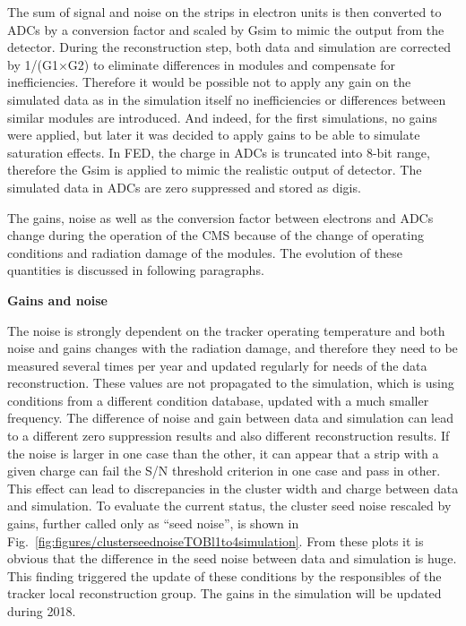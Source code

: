  The sum of signal and noise on the strips in electron units is then converted to ADCs by a conversion factor and scaled by Gsim to mimic the output from the detector. During the reconstruction step, both data and simulation are corrected by 1/(G1$\times$G2) to eliminate differences in modules and compensate for inefficiencies. Therefore it would be possible not to apply any gain on the simulated data as in the simulation itself no inefficiencies or differences between similar modules are introduced. And indeed, for the first simulations, no gains were applied, but later it was decided to apply gains to be able to simulate saturation effects. In FED, the charge in ADCs is truncated into 8-bit range, therefore the Gsim is applied to mimic the realistic output of detector. The simulated data in ADCs are zero suppressed and stored as digis.

The gains, noise as well as the conversion factor between electrons and ADCs change during the operation of the CMS because of the change of operating conditions and radiation damage of the modules. The evolution of these quantities is discussed in following paragraphs.   
 
\textbf{Gains and noise}

The noise is strongly dependent on the tracker operating temperature and both noise and gains changes with the radiation damage, and therefore they need to be measured several times per year and updated regularly for needs of the data reconstruction. These values are not propagated to the simulation, which is using conditions from a different condition database, updated with a much smaller frequency. The difference of noise and gain between data and simulation can lead to a different zero suppression results and also different reconstruction results. If the noise is larger in one case than the other, it can appear that a strip with a given charge can fail the S/N threshold criterion in one case and pass in other. This effect can lead to discrepancies in the cluster width and charge between data and simulation. To evaluate the current status, the cluster seed noise rescaled by gains, further called only as ``seed noise'', is shown in Fig.~\ref{fig:figures/clusterseednoiseTOBl1to4simulation}. From these plots it is obvious that the difference in the seed noise between data and simulation is huge. This finding triggered the update of these conditions by the responsibles of the tracker local reconstruction group. The gains in the simulation will be updated during 2018.


